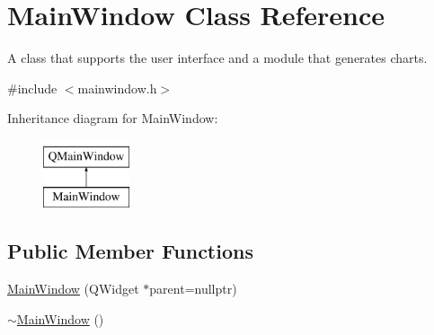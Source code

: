 \hypertarget{class_main_window}{}\section{Main\+Window Class Reference}
\label{class_main_window}


A class that supports the user interface and a module that generates charts.  




{\ttfamily \#include $<$mainwindow.\+h$>$}

Inheritance diagram for Main\+Window\+:\begin{figure}[H]
\begin{center}
\leavevmode
\includegraphics[height=2.000000cm]{class_main_window}
\end{center}
\end{figure}
\subsection*{Public Member Functions}
\begin{DoxyCompactItemize}
\item 
\mbox{\hyperlink{class_main_window_a996c5a2b6f77944776856f08ec30858d}{Main\+Window}} (Q\+Widget $\ast$parent=nullptr)
\item 
\mbox{\hyperlink{class_main_window_ae98d00a93bc118200eeef9f9bba1dba7}{$\sim$\+Main\+Window}} ()
\end{DoxyCompactItemize}
